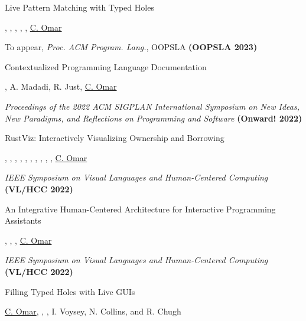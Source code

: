 \documentclass[10pt,letterpaper]{article}
\renewenvironment{itemize}{
  \begin{list}{}{
    \setlength{\leftmargin}{1.25em}
    \setlength{\itemsep}{0.25em}
    \setlength{\parskip}{0pt}
    \setlength{\parsep}{0.2em}
  }
}{
  \end{list}
}
\begin{document}
\begin{enumerate}
  \item {Live Pattern Matching with Typed Holes}
        \begin{itemize}
          \item {}, , , , , \underline{C. Omar}
          \item To appear, \textit{Proc. ACM Program. Lang.}, OOPSLA \textbf{(OOPSLA 2023)}
        \end{itemize}
  \item {Contextualized Programming Language Documentation}
        \begin{itemize}
          \item {}, A. Madadi, R. Just, \underline{C. Omar}
          \item \textit{Proceedings of the 2022 ACM SIGPLAN International Symposium on New Ideas, New Paradigms, and Reflections on Programming and Software}
                \textbf{(Onward! 2022)}
        \end{itemize}
  \item {RustViz: Interactively Visualizing Ownership and Borrowing}
        \begin{itemize}
          \item {}, , , , , , , , , , \underline{C. Omar}
          \item \textit{IEEE Symposium on Visual Languages and Human-Centered Computing} \textbf{(VL/HCC 2022)}
        \end{itemize}
  \item {An Integrative Human-Centered Architecture for Interactive Programming Assistants}
        \begin{itemize}
          \item {}, , , \underline{C. Omar}
          \item \textit{IEEE Symposium on Visual Languages and Human-Centered Computing} \textbf{(VL/HCC 2022)}
        \end{itemize}
  \item {Filling Typed Holes with Live GUIs}
        \begin{itemize}
          \item \underline{C. Omar}, , , I. Voysey, N. Collins, and R. Chugh

\end{itemize}
\end{enumerate}
\end{document}
